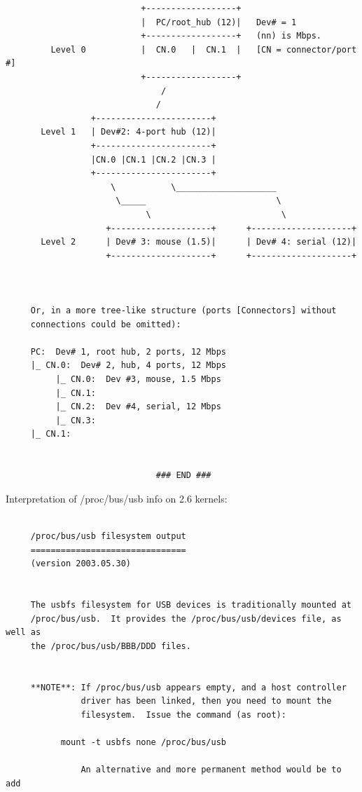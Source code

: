 {{{{{{{{{{{{{{{{{\begin{verbatim}
                           +------------------+
                           |  PC/root_hub (12)|   Dev# = 1
                           +------------------+   (nn) is Mbps.
         Level 0           |  CN.0   |  CN.1  |   [CN = connector/port #]
                           +------------------+
                               /
                              /
                 +-----------------------+
       Level 1   | Dev#2: 4-port hub (12)|
                 +-----------------------+
                 |CN.0 |CN.1 |CN.2 |CN.3 |
                 +-----------------------+
                     \           \____________________
                      \_____                          \
                            \                          \
                    +--------------------+      +--------------------+
       Level 2      | Dev# 3: mouse (1.5)|      | Dev# 4: serial (12)|
                    +--------------------+      +--------------------+
     
     
     
     Or, in a more tree-like structure (ports [Connectors] without
     connections could be omitted):
     
     PC:  Dev# 1, root hub, 2 ports, 12 Mbps
     |_ CN.0:  Dev# 2, hub, 4 ports, 12 Mbps
          |_ CN.0:  Dev #3, mouse, 1.5 Mbps
          |_ CN.1:
          |_ CN.2:  Dev #4, serial, 12 Mbps
          |_ CN.3:
     |_ CN.1:
     
     
                              ### END ###
\end{verbatim}
\normalsize

Interpretation of /proc/bus/usb info on 2.6 kernels: 

\footnotesize
\begin{verbatim}
     
     /proc/bus/usb filesystem output
     ===============================
     (version 2003.05.30)
     
     
     The usbfs filesystem for USB devices is traditionally mounted at
     /proc/bus/usb.  It provides the /proc/bus/usb/devices file, as well as
     the /proc/bus/usb/BBB/DDD files.
     
     
     **NOTE**: If /proc/bus/usb appears empty, and a host controller
               driver has been linked, then you need to mount the
               filesystem.  Issue the command (as root):
     
           mount -t usbfs none /proc/bus/usb
     
               An alternative and more permanent method would be to add
     

\end{verbatim}}}}}}}}}}}}}}}}}}
